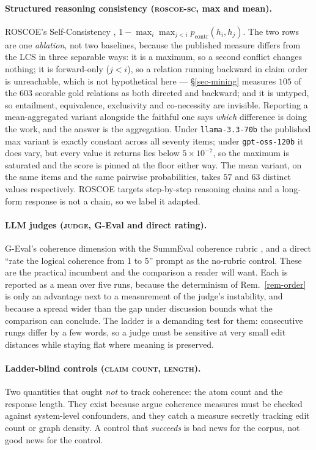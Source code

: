 \paragraph{Structured reasoning consistency (\textsc{roscoe-sc}, max and mean).} ROSCOE's
Self-Consistency \citep{roscoe}, $1-\max_{i}\max_{j<i}p_{\mathrm{contr}}(h_i,h_j)$. The two rows are
one \emph{ablation}, not two baselines, because the published measure differs from the LCS in three
separable ways: it is a maximum, so a second conflict changes nothing; it is forward-only ($j<i$), so
a relation running backward in claim order is unreachable, which is not hypothetical here ---
\S\ref{sec-mining} measures $105$ of the $603$ scorable gold relations as both directed and backward;
and it is untyped, so entailment, equivalence, exclusivity and co-necessity are invisible. Reporting
a mean-aggregated variant alongside the faithful one says \emph{which} difference is doing the work,
and the answer is the aggregation. Under \texttt{llama-3.3-70b} the published max variant is exactly
constant across all seventy items; under \texttt{gpt-oss-120b} it does vary, but every value it
returns lies below $5\times10^{-7}$, so the maximum is saturated and the score is pinned at the floor
either way. The mean variant, on the same items and the same pairwise probabilities, takes $57$ and
$63$ distinct values respectively. ROSCOE targets step-by-step reasoning chains and a long-form
response is not a chain, so we label it adapted.

\paragraph{LLM judges (\textsc{judge}, G-Eval and direct rating).} G-Eval's coherence dimension
\citep{geval} with the SummEval coherence rubric \citep{summeval}, and a direct ``rate the logical
coherence from 1 to 5'' prompt as the no-rubric control. These are the practical incumbent and the
comparison a reader will want. Each is reported as a mean over five runs, because the determinism of
Rem.~\ref{rem-order} is only an advantage next to a measurement of the judge's instability, and
because a spread wider than the gap under discussion bounds what the comparison can conclude. The
ladder is a demanding test for them: consecutive rungs differ by a few words, so a judge must be
sensitive at very small edit distances while staying flat where meaning is preserved.

\paragraph{Ladder-blind controls (\textsc{claim count}, \textsc{length}).} Two quantities that ought
\emph{not} to track coherence: the atom count and the response length. They exist because
\citet{steenmarkert} argue coherence measures must be checked against system-level confounders, and
they catch a measure secretly tracking edit count or graph density. A control that
\emph{succeeds} is bad news for the corpus, not good news for the control.

